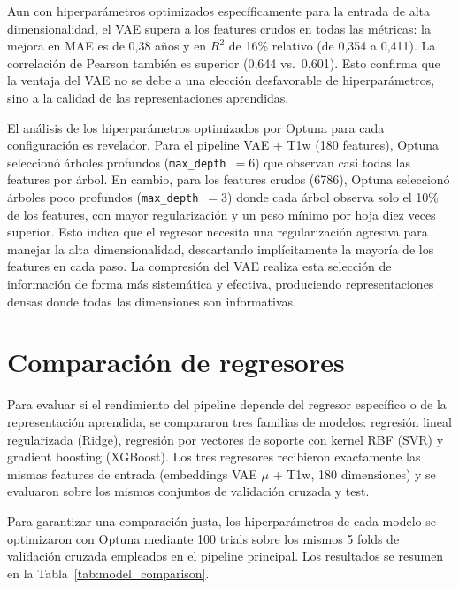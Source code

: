 Aun con hiperparámetros optimizados específicamente para la entrada de alta dimensionalidad, el VAE supera a los features crudos en todas las métricas: la mejora en MAE es de 0,38 años y en $R^2$ de 16\% relativo (de 0,354 a 0,411). La correlación de Pearson también es superior (0,644 vs.\ 0,601). Esto confirma que la ventaja del VAE no se debe a una elección desfavorable de hiperparámetros, sino a la calidad de las representaciones aprendidas.

El análisis de los hiperparámetros optimizados por Optuna para cada configuración es revelador. Para el pipeline VAE + T1w (180 features), Optuna seleccionó árboles profundos (\texttt{max\_depth}~$= 6$) que observan casi todas las features por árbol. En cambio, para los features crudos (6786), Optuna seleccionó árboles poco profundos (\texttt{max\_depth}~$= 3$) donde cada árbol observa solo el 10\% de los features, con mayor regularización y un peso mínimo por hoja diez veces superior. Esto indica que el regresor necesita una regularización agresiva para manejar la alta dimensionalidad, descartando implícitamente la mayoría de los features en cada paso. La compresión del VAE realiza esta selección de información de forma más sistemática y efectiva, produciendo representaciones densas donde todas las dimensiones son informativas.


\section{Comparación de regresores}
\label{sec:res_regresores}

Para evaluar si el rendimiento del pipeline depende del regresor específico o de la representación aprendida, se compararon tres familias de modelos: regresión lineal regularizada (Ridge), regresión por vectores de soporte con kernel RBF (SVR) y gradient boosting (XGBoost). Los tres regresores recibieron exactamente las mismas features de entrada (embeddings VAE $\mu$ + T1w, 180 dimensiones) y se evaluaron sobre los mismos conjuntos de validación cruzada y test.

Para garantizar una comparación justa, los hiperparámetros de cada modelo se optimizaron con Optuna mediante 100 trials sobre los mismos 5 folds de validación cruzada empleados en el pipeline principal. Los resultados se resumen en la Tabla~\ref{tab:model_comparison}.

